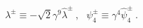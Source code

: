 \begin{equation}
\lambda^\pm \equiv - \sqrt{2} \gamma^9 \hat{\lambda}^\pm~,~~~
\psi^\pm_4 \equiv \gamma^4 \hat{\psi}^\pm_4 ~.
\label{redef}
\end{equation}

